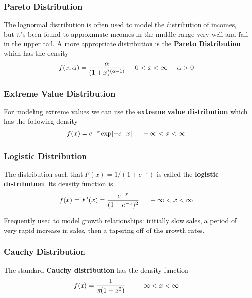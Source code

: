 \documentclass{article}
\begin{document}
\subsubsection{Pareto Distribution}

The lognormal distribution is often used to model the distribution of incomes, but it's been found to approximate incomes in the middle range very well and fail in the upper tail. A more appropriate distribution is the \textbf{Pareto Distribution} which has the density
\begin{equation*}
    f(x;\alpha)=\frac{\alpha}{(1+x)^{(\alpha+1)}} \hspace{0.5cm} 0 < x < \infty \hspace{0.5cm} \alpha>0
\end{equation*}

\subsubsection{Extreme Value Distribution}

For modeling extreme values we can use the \textbf{extreme value distribution} which has the following density
\begin{equation*}
    f(x)=e^{-x} \exp [-e^-x] \hspace{0.5cm} -\infty < x < \infty
\end{equation*}

\subsubsection{Logistic Distribution}

The distribution such that \(F(x)=1/(1+e^{-x})\) is called the \textbf{logistic distribution}. Its density function is
\begin{equation*}
    f(x)=F'(x)=\frac{e^{-x}}{(1+e^{-x})^2} \hspace{0.5cm} -\infty<x<\infty
\end{equation*}

Frequently used to model growth relationships: initially slow sales, a period of very rapid increase in sales, then a tapering off of the growth rates.

\subsubsection{Cauchy Distribution}

The standard \textbf{Cauchy distribution} has the density function
\begin{equation*}
    f(x)=\frac{1}{\pi(1+x^2)} \hspace{0.5cm} -\infty<x<\infty
\end{equation*}
\end{document}
